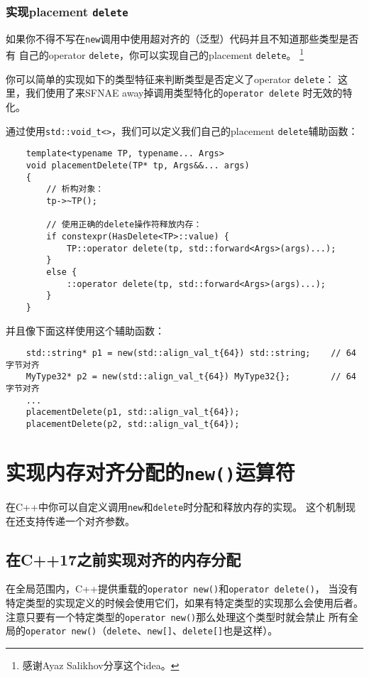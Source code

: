 \subsubsection{实现placement \texttt{delete}}\label{ch30.1.2.2}
如果你不得不写在\texttt{new}调用中使用超对齐的（泛型）代码并且不知道那些类型是否有
自己的operator \texttt{delete}，你可以实现自己的placement \texttt{delete}。
\footnote{感谢Ayaz Salikhov分享这个idea。}

你可以简单的实现如下的类型特征来判断类型是否定义了operator \texttt{delete}：
这里，我们使用了来SFNAE away掉调用类型特化的\texttt{operator delete}
时无效的特化。

通过使用\texttt{std::void\_t<>}，我们可以定义我们自己的placement \texttt{delete}辅助函数：
\begin{lstlisting}
    template<typename TP, typename... Args>
    void placementDelete(TP* tp, Args&&... args)
    {
        // 析构对象：
        tp->~TP();

        // 使用正确的delete操作符释放内存：
        if constexpr(HasDelete<TP>::value) {
            TP::operator delete(tp, std::forward<Args>(args)...);
        }
        else {
            ::operator delete(tp, std::forward<Args>(args)...);
        }
    }
\end{lstlisting}
并且像下面这样使用这个辅助函数：
\begin{lstlisting}
    std::string* p1 = new(std::align_val_t{64}) std::string;    // 64字节对齐
    MyType32* p2 = new(std::align_val_t{64}) MyType32{};        // 64字节对齐
    ...
    placementDelete(p1, std::align_val_t{64});
    placementDelete(p2, std::align_val_t{64});
\end{lstlisting}


\section{实现内存对齐分配的\texttt{new()}运算符}\label{ch30.2}
在C++中你可以自定义调用\texttt{new}和\texttt{delete}时分配和释放内存的实现。
这个机制现在还支持传递一个对齐参数。

\subsection{在C++17之前实现对齐的内存分配}
在全局范围内，C++提供重载的\texttt{operator new()}和\texttt{operator delete()}，
当没有特定类型的实现定义的时候会使用它们，如果有特定类型的实现那么会使用后者。
注意只要有一个特定类型的\texttt{operator new()}那么处理这个类型时就会禁止
所有全局的\texttt{operator new()}（\texttt{delete}、\texttt{new[]}、\texttt{delete[]}也是这样）。

